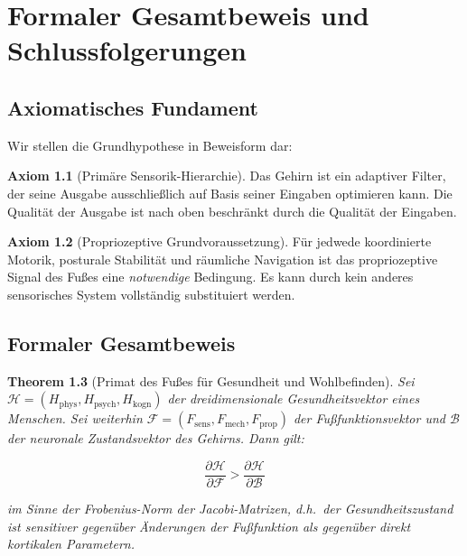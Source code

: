 ﻿\documentclass[12pt,a4paper]{report}
\theoremstyle{plain}
\newtheorem{theorem}{Theorem}[section]
\theoremstyle{definition}
\newtheorem{axiom}[theorem]{Axiom}
\theoremstyle{remark}
\begin{document}
\chapter{Formaler Gesamtbeweis und Schlussfolgerungen}

\section{Axiomatisches Fundament}

Wir stellen die Grundhypothese in Beweisform dar:

\begin{axiom}[Primäre Sensorik-Hierarchie]
Das Gehirn ist ein adaptiver Filter, der seine Ausgabe ausschließlich
auf Basis seiner Eingaben optimieren kann. Die Qualität der Ausgabe
ist nach oben beschränkt durch die Qualität der Eingaben.
\end{axiom}

\begin{axiom}[Propriozeptive Grundvoraussetzung]
Für jedwede koordinierte Motorik, posturale Stabilität und räumliche
Navigation ist das propriozeptive Signal des Fußes eine
\emph{notwendige} Bedingung. Es kann durch kein anderes sensorisches
System vollständig substituiert werden.
\end{axiom}

\section{Formaler Gesamtbeweis}\label{sec:formaler_beweis}

\begin{theorem}[Primat des Fußes für Gesundheit und Wohlbefinden]
Sei $\mathcal{H} = (H_{\text{phys}}, H_{\text{psych}}, H_{\text{kogn}})$
der dreidimensionale Gesundheitsvektor eines Menschen. Sei weiterhin
$\mathcal{F} = (F_{\text{sens}}, F_{\text{mech}}, F_{\text{prop}})$
der Fußfunktionsvektor und $\mathcal{B}$ der neuronale Zustandsvektor
des Gehirns. Dann gilt:

\[
  \frac{\partial \mathcal{H}}{\partial \mathcal{F}} > \frac{\partial \mathcal{H}}{\partial \mathcal{B}}
\]

im Sinne der Frobenius-Norm der Jacobi-Matrizen, d.h.\ der Gesundheitszustand
ist sensitiver gegenüber Änderungen der Fußfunktion als gegenüber
direkt kortikalen Parametern.
\end{theorem}
\end{document}
